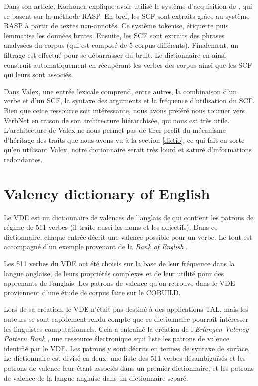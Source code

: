 Dans son article, Korhonen explique avoir utilisé le système d'acquisition de \cite{BriscoeSecondReleaseRASP2006}, qui se basent sur la méthode RASP. En bref, les \ac{SCF} sont extraits grâce au système RASP à partir de textes non-annotés. Ce système tokenise, étiquette puis lemmatise les données brutes. Ensuite, les \ac{SCF} sont extraits des phrases analysées du corpus (qui est composé de 5 corpus différents). Finalement, un filtrage est effectué pour se débarrasser du bruit. Le dictionnaire en ainsi construit automatiquement en récupérant les verbes des corpus ainsi que les \ac{SCF} qui leurs sont associés.

Dans Valex, une entrée lexicale comprend, entre autres, la combinaison d'un verbe et d'un SCF, la syntaxe des arguments et la fréquence d'utilisation du SCF. Bien que cette ressource soit intéressante, nous avons préféré nous tourner vers VerbNet en raison de son architecture hiérarchisée, qui nous est très utile. L'architecture de Valex ne nous permet pas de tirer profit du mécanisme d'héritage des traits que nous avons vu à la section \ref{dictio}, ce qui fait en sorte qu'en utilisant Valex, notre dictionnaire serait très lourd et saturé d'informations redondantes.

\section{Valency dictionary of English}
Le \acf{VDE} est un dictionnaire de valences de l'anglais de \cite{HerbstValencyDictionaryEnglish2004} qui contient les patrons de régime de 511 verbes (il traite aussi les noms et les adjectifs). Dans ce dictionnaire, chaque entrée décrit une valence possible pour un verbe. Le tout est accompagné d'un exemple provenant de la \emph{Bank of English} .

Les 511 verbes du VDE ont été choisis sur la base de leur fréquence dans la langue anglaise, de leurs propriétés complexes et de leur utilité pour des apprenants de l'anglais. Les patrons de valence qu'on retrouve dans le VDE proviennent d'une étude de corpus faite sur le COBUILD. 

Lors de sa création, le VDE n'était pas destiné à des applications TAL, mais les auteurs se sont rapidement rendu compte que ce dictionnaire pourrait intéresser les linguistes computationnels. Cela a entraîné la création de l'\emph{Erlangen Valency Pattern Bank} \citep{faucris.1039365}, une ressource électronique squi liste les patrons de valence identifié par le VDE. Les patrons y sont décrits en termes de syntaxe de surface. Le dictionnaire est divisé en deux: une liste des 511 verbes désambiguïsés et les patrons de valence leur étant associés dans un premier dictionnaire, et les patrons de valence de la langue anglaise dans un dictionnaire séparé.


